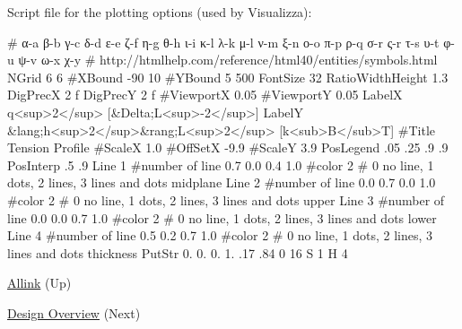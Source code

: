 Script file for the plotting options (used by Visualizza)\+: 
\begin{DoxyCode}
\textcolor{preprocessor}{# α-a β-b γ-c δ-d ε-e ζ-f η-g θ-h ι-i κ-l λ-k μ-l ν-m ξ-n ο-o π-p ρ-q σ-r ς-r τ-s υ-t φ-u ψ-v ω-x χ-y  }
\textcolor{preprocessor}{# http://htmlhelp.com/reference/html40/entities/symbols.html}
NGrid
6 6
\textcolor{preprocessor}{#XBound}
-90 10
\textcolor{preprocessor}{#YBound}
5 500
FontSize
32
RatioWidthHeight
1.3
DigPrecX
2 f
DigPrecY
2 f
\textcolor{preprocessor}{#ViewportX}
0.05
#ViewportY
0.05
LabelX
q<sup>2</sup> [&Delta;L<sup>-2</sup>]
LabelY
&lang;h<sup>2</sup>&rang;L<sup>2</sup> [k<sub>B</sub>T]
\textcolor{preprocessor}{#Title}
Tension Profile
\textcolor{preprocessor}{#ScaleX}
1.0     
\textcolor{preprocessor}{#OffSetX}
-9.9
#ScaleY
3.9
PosLegend
.05 .25 .9 .9
PosInterp
.5 .9 
Line
1 #number of line
0.7 0.0 0.4 1.0 #color
2 # 0 no line, 1 dots, 2 lines, 3 lines and dots
midplane
Line
2 #number of line
0.0 0.7 0.0 1.0 #color
2 # 0 no line, 1 dots, 2 lines, 3 lines and dots
upper 
Line
3 #number of line
0.0 0.0 0.7 1.0 #color
2 # 0 no line, 1 dots, 2 lines, 3 lines and dots
lower
Line
4 #number of line
0.5 0.2 0.7 1.0 #color
2 # 0 no line, 1 dots, 2 lines, 3 lines and dots
thickness
PutStr
0. 0. 0. 1.
.17 .84 0 16
S 1 H 4
\end{DoxyCode}



\begin{DoxyItemize}
\item \hyperlink{index}{Allink} (Up)  
\item \hyperlink{design_page}{Design Overview} (Next)  
\end{DoxyItemize}